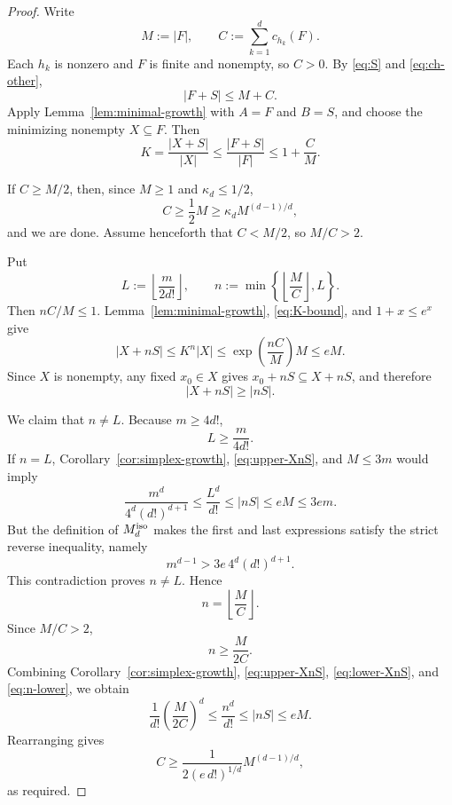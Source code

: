 \documentclass[11pt]{article}
\theoremstyle{definition}
\newcommand{\1}{\mathbf{1}}
\begin{document}
\begin{proof}
Write
\[
  M:=|F|,
  \qquad
  C:=\sum_{k=1}^d c_{h_k}(F).
\]
Each $h_k$ is nonzero and $F$ is finite and nonempty, so $C>0$.  By \eqref{eq:S} and \eqref{eq:ch-other},
\begin{equation}\label{eq:FplusS}
  |F+S|
  \le M+C.
\end{equation}
Apply Lemma~\ref{lem:minimal-growth} with $A=F$ and $B=S$, and choose the minimizing nonempty $X\subseteq F$.  Then
\begin{equation}\label{eq:K-bound}
  K=\frac{|X+S|}{|X|}
  \le\frac{|F+S|}{|F|}
  \le1+\frac CM.
\end{equation}

If $C\ge M/2$, then, since $M\ge1$ and $\kappa_d\le1/2$,
\[
  C\ge\frac12M\ge\kappa_d M^{(d-1)/d},
\]
and we are done.  Assume henceforth that $C<M/2$, so $M/C>2$.

Put
\begin{equation}\label{eq:L-n}
  L:=\left\lfloor\frac{m}{2d!}\right\rfloor,
  \qquad
  n:=\min\left\{\left\lfloor\frac MC\right\rfloor,L\right\}.
\end{equation}
Then $nC/M\le1$.  Lemma~\ref{lem:minimal-growth}, \eqref{eq:K-bound}, and $1+x\le e^x$ give
\begin{equation}\label{eq:upper-XnS}
  |X+nS|
  \le K^n|X|
  \le\exp\!\left(\frac{nC}{M}\right)M
  \le eM.
\end{equation}
Since $X$ is nonempty, any fixed $x_0\in X$ gives $x_0+nS\subseteq X+nS$, and therefore
\begin{equation}\label{eq:lower-XnS}
  |X+nS|\ge|nS|.
\end{equation}

We claim that $n\ne L$.  Because $m\ge4d!$,
\[
  L\ge\frac{m}{4d!}.
\]
If $n=L$, Corollary~\ref{cor:simplex-growth}, \eqref{eq:upper-XnS}, and $M\le3m$ would imply
\[
  \frac{m^d}{4^d(d!)^{d+1}}
  \le\frac{L^d}{d!}
  \le |nS|
  \le eM
  \le3em.
\]
But the definition of $M_d^{\rm iso}$ makes the first and last expressions satisfy the strict reverse inequality, namely
\[
  m^{d-1}>3e\,4^d(d!)^{d+1}.
\]
This contradiction proves $n\ne L$.  Hence
\[
  n=\left\lfloor\frac MC\right\rfloor.
\]
Since $M/C>2$,
\begin{equation}\label{eq:n-lower}
  n\ge\frac{M}{2C}.
\end{equation}
Combining Corollary~\ref{cor:simplex-growth}, \eqref{eq:upper-XnS}, \eqref{eq:lower-XnS}, and \eqref{eq:n-lower}, we obtain
\[
  \frac1{d!}\left(\frac{M}{2C}\right)^d
  \le\frac{n^d}{d!}
  \le|nS|
  \le eM.
\]
Rearranging gives
\[
  C\ge\frac1{2(e\,d!)^{1/d}}M^{(d-1)/d},
\]
as required.
\end{proof}
\end{document}
